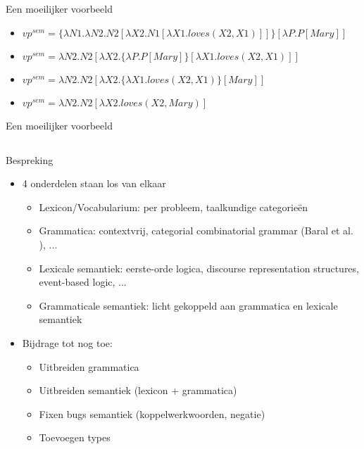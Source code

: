 \documentclass[notes, dvipsnames]{beamer}
\newcommand{\hitem}{
	\ppause
	\item
}
\newcommand{\ppause}{\onslide<+>}
\newcommand{\attention}[1]{\textcolor{ForestGreen}{#1}}
\begin{document}
	\begin{frame}{Een moeilijker voorbeeld}
    \begin{itemize}
      \hitem $vp^{sem} = \{\lambda N1.\lambda N2.N2[\lambda X2.N1[\lambda X1.loves(X2,X1)]]\}[\lambda P.P[Mary]]$
      \hitem $vp^{sem} = \lambda N2.N2[\lambda X2.\{\lambda P.P[Mary]\}[\lambda X1.loves(X2,X1)]]$
      \hitem $vp^{sem} = \lambda N2.N2[\lambda X2.\{\lambda X1.loves(X2,X1)\}[Mary]]$
      \hitem $vp^{sem} = \lambda N2.N2[\lambda X2.loves(X2,Mary)]$
    \end{itemize}
	\end{frame}
	\begin{frame}{Een moeilijker voorbeeld}
	\end{frame}

  \subsection{}
	\begin{frame}{Bespreking}
    \begin{itemize}
      \hitem 4 onderdelen staan los van elkaar
      \begin{itemize}
        \hitem Lexicon/Vocabularium: per probleem, taalkundige categorieën
        \hitem Grammatica: contextvrij, categorial combinatorial grammar (Baral et al. \cite{Baral2008}), ...
        \hitem Lexicale semantiek: eerste-orde logica, discourse representation structures, event-based logic, ...
        \hitem Grammaticale semantiek: licht gekoppeld aan grammatica en lexicale semantiek
      \end{itemize}
      \hitem Bijdrage tot nog toe:
      \begin{itemize}
        \item Uitbreiden grammatica
        \item Uitbreiden semantiek (lexicon + grammatica)
        \item Fixen bugs semantiek (koppelwerkwoorden, negatie)
        \item Toevoegen types
      \end{itemize}
    \end{itemize}
	\end{frame}
\end{document}
